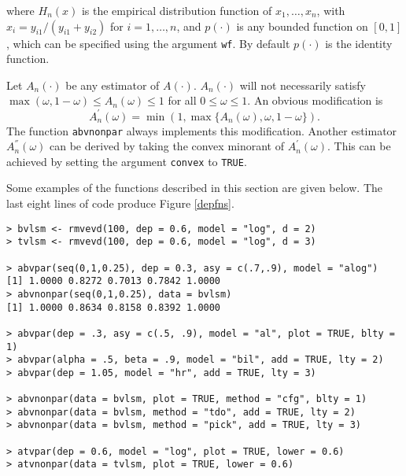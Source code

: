 \documentclass[11pt,a4paper]{article}
\begin{document}


where $H_n(x)$ is the empirical distribution function of $x_1,\dots,x_n$, with $x_i = y_{i1} / (y_{i1} + y_{i2})$ for $i=1,\dots,n$, and $p(\cdot)$ is any bounded function on $[0,1]$, which can be specified using the argument \verb+wf+.
By default $p(\cdot)$ is the identity function.

Let $A_n(\cdot)$ be any estimator of $A(\cdot)$. 
$A_n(\cdot)$ will not necessarily satisfy $\max(\omega,1-\omega) \leq A_n(\omega) \leq 1$ for all $0\leq\omega\leq1$.  
An obvious modification is
\begin{equation*}
A_n^{'}(\omega) = \min(1, \max\{A_n(\omega), \omega, 1-\omega\}).
\end{equation*}
The function \verb+abvnonpar+ always implements this modification. 
Another estimator $A_n^{''}(\omega)$ can be derived by taking the convex minorant of $A_n^{'}(\omega)$. 
This can be achieved by setting the argument \verb+convex+ to \verb+TRUE+.

Some examples of the functions described in this section are given below.
The last eight lines of code produce Figure \ref{depfns}.

\begin{verbatim}
> bvlsm <- rmvevd(100, dep = 0.6, model = "log", d = 2)
> tvlsm <- rmvevd(100, dep = 0.6, model = "log", d = 3)

> abvpar(seq(0,1,0.25), dep = 0.3, asy = c(.7,.9), model = "alog")
[1] 1.0000 0.8272 0.7013 0.7842 1.0000
> abvnonpar(seq(0,1,0.25), data = bvlsm)
[1] 1.0000 0.8634 0.8158 0.8392 1.0000

> abvpar(dep = .3, asy = c(.5, .9), model = "al", plot = TRUE, blty = 1)
> abvpar(alpha = .5, beta = .9, model = "bil", add = TRUE, lty = 2)
> abvpar(dep = 1.05, model = "hr", add = TRUE, lty = 3)

> abvnonpar(data = bvlsm, plot = TRUE, method = "cfg", blty = 1)
> abvnonpar(data = bvlsm, method = "tdo", add = TRUE, lty = 2)
> abvnonpar(data = bvlsm, method = "pick", add = TRUE, lty = 3)

> atvpar(dep = 0.6, model = "log", plot = TRUE, lower = 0.6)
> atvnonpar(data = tvlsm, plot = TRUE, lower = 0.6)
\end{verbatim}
\end{document}
